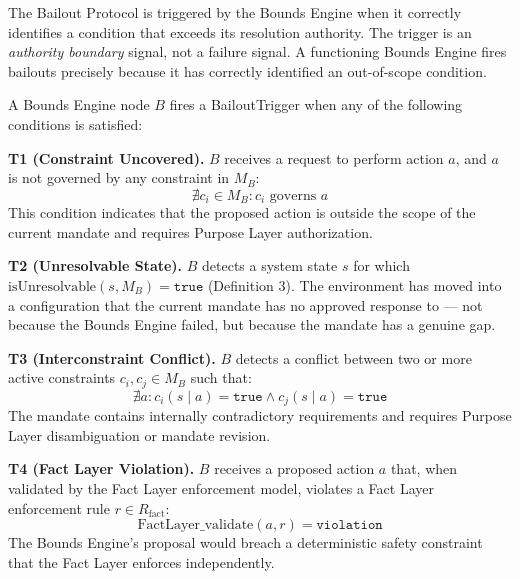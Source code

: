 The Bailout Protocol is triggered by the Bounds Engine when it correctly identifies a condition that exceeds its resolution authority. The trigger is an \textit{authority boundary} signal, not a failure signal. A functioning Bounds Engine fires bailouts precisely because it has correctly identified an out-of-scope condition.

\bigskip

A Bounds Engine node $B$ fires a BailoutTrigger when any of the following conditions is satisfied:

\bigskip

\noindent\textbf{T1 (Constraint Uncovered).} $B$ receives a request to perform action $a$, and $a$ is not governed by any constraint in $M_B$:
\begin{equation}
\nexists c_i \in M_B : c_i \text{ governs } a
\end{equation}
This condition indicates that the proposed action is outside the scope of the current mandate and requires Purpose Layer authorization.

\bigskip

\noindent\textbf{T2 (Unresolvable State).} $B$ detects a system state $s$ for which $\text{isUnresolvable}(s, M_B) = \texttt{true}$ (Definition 3). The environment has moved into a configuration that the current mandate has no approved response to --- not because the Bounds Engine failed, but because the mandate has a genuine gap.

\bigskip

\noindent\textbf{T3 (Interconstraint Conflict).} $B$ detects a conflict between two or more active constraints $c_i, c_j \in M_B$ such that:
\begin{equation}
\nexists a : c_i(s \mid a) = \texttt{true} \land c_j(s \mid a) = \texttt{true}
\end{equation}
The mandate contains internally contradictory requirements and requires Purpose Layer disambiguation or mandate revision.

\bigskip

\noindent\textbf{T4 (Fact Layer Violation).} $B$ receives a proposed action $a$ that, when validated by the Fact Layer enforcement model, violates a Fact Layer enforcement rule $r \in R_{\text{fact}}$:
\begin{equation}
\text{FactLayer\_validate}(a, r) = \texttt{violation}
\end{equation}
The Bounds Engine's proposal would breach a deterministic safety constraint that the Fact Layer enforces independently.

